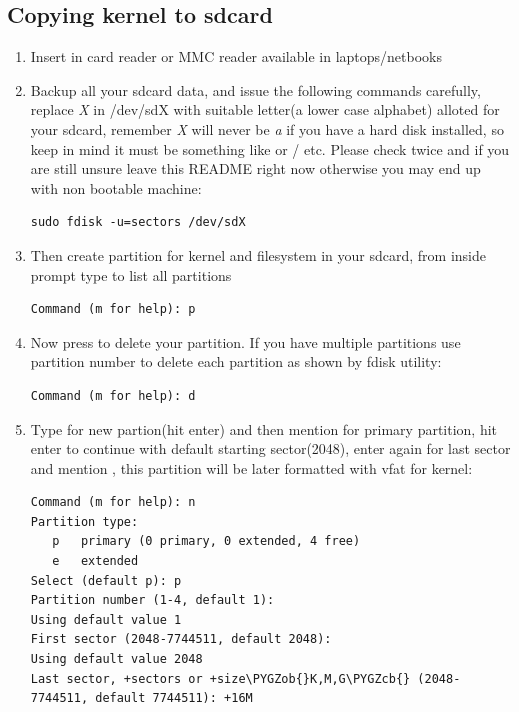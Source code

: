 \documentclass[letterpaper,10pt,english]{sphinxmanual}
\def\PYGZob{\char`\{}
\def\PYGZcb{\char`\}}
\begin{document}
\subsection{Copying kernel to sdcard}
\label{embedded-linux:copying-kernel-to-sdcard}\begin{enumerate}
\item {} 
Insert  in card reader or MMC reader available in laptops/netbooks

\item {} 
Backup all your sdcard data, and issue the following commands carefully, replace
\emph{X} in /dev/sdX with suitable letter(a lower case alphabet) alloted for your
sdcard, remember \emph{X} will never be \emph{a} if you have a hard disk installed, so keep
in mind it must be something like  or / etc. Please check
twice and if you are still unsure leave this README right now otherwise you may
end up with non bootable machine:

\begin{Verbatim}[commandchars=\\\{\}]
sudo fdisk -u=sectors /dev/sdX
\end{Verbatim}

\item {} 
Then create partition for kernel and filesystem in your sdcard, from
inside  prompt type  to list all partitions

\begin{Verbatim}[commandchars=\\\{\}]
Command (m for help): p
\end{Verbatim}

\item {} 
Now press  to delete your partition. If you have multiple partitions use partition number
to delete each partition as shown by fdisk utility:

\begin{Verbatim}[commandchars=\\\{\}]
Command (m for help): d
\end{Verbatim}

\item {} 
Type  for new partion(hit enter) and then mention  for primary partition, hit
enter to continue with default starting sector(2048), enter again for last sector and
mention , this partition will be later formatted with vfat for kernel:

\begin{Verbatim}[commandchars=\\\{\}]
Command (m for help): n
Partition type:
   p   primary (0 primary, 0 extended, 4 free)
   e   extended
Select (default p): p
Partition number (1-4, default 1):
Using default value 1
First sector (2048-7744511, default 2048):
Using default value 2048
Last sector, +sectors or +size\PYGZob{}K,M,G\PYGZcb{} (2048-7744511, default 7744511): +16M
\end{Verbatim}


\end{enumerate}
\end{document}
